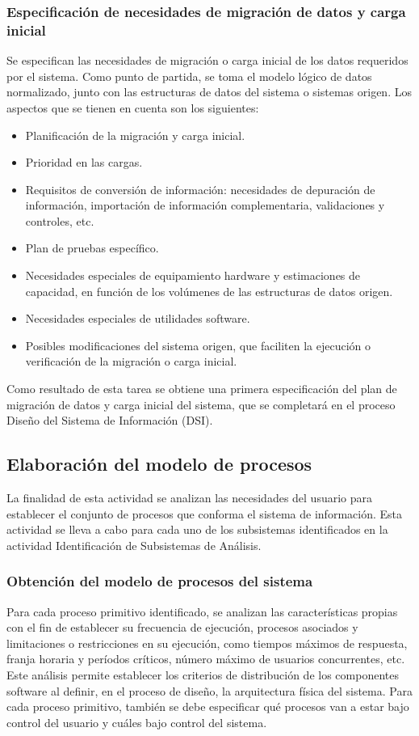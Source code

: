 \documentclass[11pt,a4paper,spanish,twoside]{report}
\begin{document}
\subsubsection{Especificación de necesidades de migración de datos y carga
  inicial}
Se especifican las necesidades de migración o carga inicial de los datos
requeridos por el sistema. Como punto de partida, se toma el modelo lógico de
datos normalizado, junto con las estructuras de datos del sistema o sistemas
origen. 
Los aspectos que se tienen en cuenta son los siguientes:
\begin{itemize}
\item Planificación de la migración y carga inicial.
\item Prioridad en las cargas.
\item Requisitos de conversión de información: necesidades de depuración de
  información, importación de información complementaria, validaciones y
  controles, etc.
\item Plan de pruebas específico.
\item Necesidades especiales de equipamiento hardware y estimaciones de
  capacidad, en función de los volúmenes de las estructuras de datos origen.
\item Necesidades especiales de utilidades software.
\item Posibles modificaciones del sistema origen, que faciliten la ejecución
  o verificación de la migración o carga inicial.
\end{itemize}

Como resultado de esta tarea se obtiene una primera especificación del plan de
migración de datos y carga inicial del sistema, que se completará en el
proceso Diseño del Sistema de Información (DSI).

\subsection{Elaboración del modelo de procesos}
La finalidad de esta actividad se analizan las necesidades del usuario para
establecer el conjunto de procesos que conforma el sistema de información.
Esta actividad se lleva a cabo para cada uno de los subsistemas identificados
en la actividad Identificación de Subsistemas de Análisis.

\subsubsection{Obtención del modelo de procesos del sistema}
Para cada proceso primitivo identificado, se analizan las características
propias con el fin de establecer su frecuencia de ejecución, procesos
asociados y limitaciones o restricciones en su ejecución, como tiempos
máximos de respuesta, franja horaria y períodos críticos, número máximo de
usuarios concurrentes, etc. Este análisis permite establecer los criterios de
distribución de los componentes software al definir, en el proceso de diseño,
la arquitectura física del sistema. 
Para cada proceso primitivo, también se debe especificar qué procesos van a
estar bajo control del usuario y cuáles bajo control del sistema. 
\end{document}
